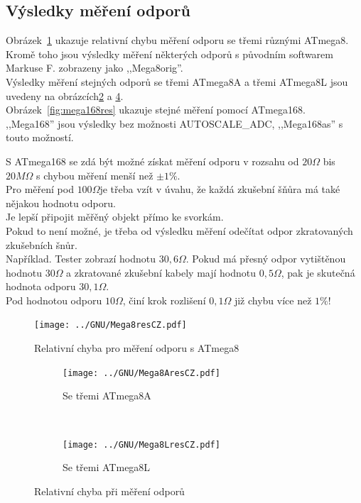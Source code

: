 \subsection{Výsledky měření odporů}
Obrázek~\ref{fig:mega8res}  ukazuje relativní chybu měření odporu se třemi různými ATmega8.\\
Kromě toho jsou výsledky měření některých odporů s původním softwarem Markuse F. zobrazeny jako ,,Mega8orig''.
\\Výsledky měření stejných odporů se třemi ATmega8A a třemi ATmega8L jsou uvedeny na obrázcích\ref{fig:mega8Ares} a \ref{fig:mega8Lres}.\\
Obrázek~\ref{fig:mega168res} ukazuje stejné měření pomocí ATmega168.\\
,,Mega168'' jsou výsledky bez možnosti AUTOSCALE\_ADC, ,,Mega168as'' s touto možností.

S ATmega168 se zdá být možné získat měření odporu v rozsahu od \(20\Omega\) bis \(20M\Omega\) s chybou měření menší než  \(\pm1\%\).\\
Pro měření pod \(100\Omega\)je třeba vzít v úvahu, že každá zkušební šňůra má také nějakou hodnotu odporu.\\
Je lepší připojit měřěný objekt přímo ke svorkám.\\
Pokud to není možné, je třeba od výsledku měření odečítat odpor zkratovaných zkušebních šnůr.\\


Například. Tester zobrazí hodnotu \(30,6\Omega\). Pokud má přesný odpor vytištěnou hodnotu \(30\Omega\)
a zkratované zkušební kabely mají hodnotu  \(0,5\Omega\), pak je skutečná hodnota odporu \(30,1\Omega\).\\
Pod hodnotou odporu \(10\Omega\), činí krok rozlišení \(0,1\Omega\) již chybu více než \(1\%\)!

\begin{figure}[H]
\centering
 \texttt{[image: ../GNU/Mega8resCZ.pdf]}
\caption{Relativní chyba pro měření odporu s ATmega8}
\label{fig:mega8res}
\end{figure}

\begin{figure}[H]
  \begin{subfigure}[b]{9cm}
    \centering
    \texttt{[image: ../GNU/Mega8AresCZ.pdf]}
    \caption{Se třemi ATmega8A}
    \label{fig:mega8Ares}
  \end{subfigure}
  ~
  \begin{subfigure}[b]{9cm}
    \centering
    \texttt{[image: ../GNU/Mega8LresCZ.pdf]}
    \caption{Se třemi ATmega8L}
    \label{fig:mega8Lres}
  \end{subfigure}
\caption{Relativní chyba při měření odporů}
\end{figure}

